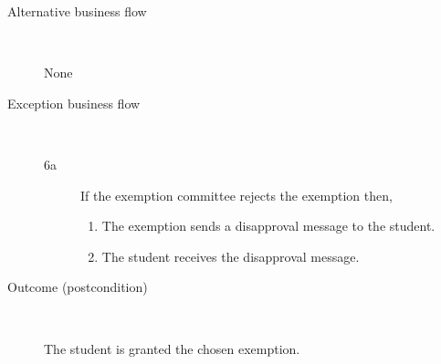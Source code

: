 \begin{description}
\begin{enumerate}
	\end{enumerate}
	\item[Alternative business flow] \ 
		\par None
	\item[Exception business flow] \ 
	\begin{description}
		\item[6a]  If the exemption committee rejects the exemption then,
		\begin{enumerate}
		  \item The exemption sends a disapproval message to the student.
		  \item The student receives the disapproval message.
		\end{enumerate}
	\end{description}
	\item[Outcome (postcondition)] \ 
		\par The student is granted the chosen exemption.
\end{description}
